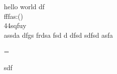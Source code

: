 \documentclass{article}
\begin{document}
	hello world df \textbf{\gitRel}\\
	fffas:\gitRoff(\gitCommitterDate)\\
	44sqfuy
	\\
	assda dfgs
	frdsa fsd d dfsd sdfsd
	asfa
	\newpage
\begin{changelog}[author=Michele]
\begin{version}[version=1.0.23.65.256]=
	\added
	\item sdf
	\end{version}
	\end{changelog}
\end{document}
